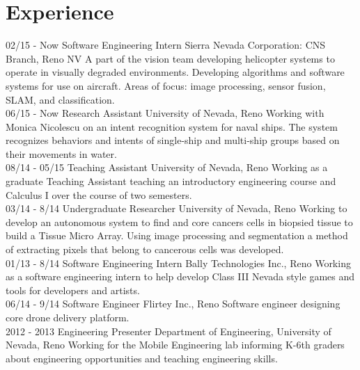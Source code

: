 \documentclass[]{friggeri-cv}
\begin{document}
\section{Experience}
\begin{entrylist}
  \entry
    {02/15 - Now}
    {Software Engineering Intern}
    {Sierra Nevada Corporation: CNS Branch, Reno NV}
    {A part of the vision team developing helicopter systems to operate in visually degraded environments. Developing algorithms and software systems for use on aircraft. Areas of focus: image processing, sensor fusion, SLAM, and classification.\\}
  \entry
    {06/15 - Now}
    {Research Assistant}
    {University of Nevada, Reno}
    {Working with Monica Nicolescu on an intent recognition system for naval ships. The system recognizes behaviors and intents of single-ship and multi-ship groups based on their movements in water.\\}
  \entry
    {08/14 - 05/15}
    {Teaching Assistant}
    {University of Nevada, Reno}
    {Working as a graduate Teaching Assistant teaching an introductory engineering course and Calculus I over the course of two semesters.\\}
  \entry
    {03/14 - 8/14}
    {Undergraduate Researcher}
    {University of Nevada, Reno}
    {Working to develop an autonomous system to find and core cancers cells in biopsied tissue to build a Tissue Micro Array. Using image processing and segmentation a method of extracting pixels that belong to cancerous cells was developed.\\}
    \entry
    {01/13 - 8/14}
    {Software Engineering Intern}
    {Bally Technologies Inc., Reno}
    {Working as a software engineering intern to help develop Class III Nevada style games and tools for developers and artists.\\}
    \entry
    {06/14 - 9/14}
    {Software Engineer}
    {Flirtey Inc., Reno}
    {Software engineer designing core drone delivery platform.\\}
    \entry
    {2012 - 2013}
    {Engineering Presenter}
    {Department of Engineering, University of Nevada, Reno}
    {Working for the Mobile Engineering lab informing K-6th graders about engineering opportunities and teaching engineering skills.}
\end{entrylist}
\end{document}

